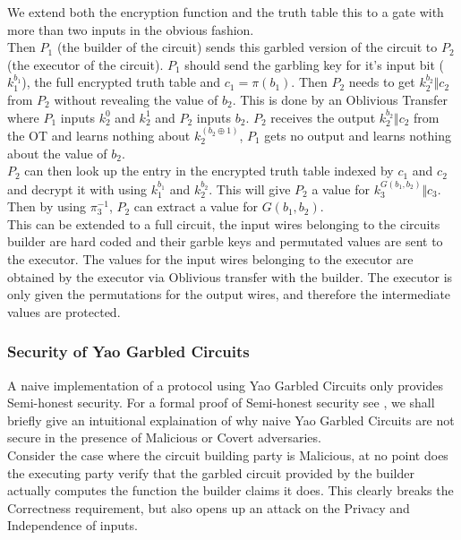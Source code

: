 \documentclass[a4paper,10pt]{article}
\begin{document}
				We extend both the encryption function and the truth table this to a gate with more than two inputs in the obvious fashion.\\

				Then $P_1$ (the builder of the circuit) sends this garbled version of the circuit to $P_2$ (the executor of the circuit). $P_1$ should send the garbling key for it's input bit ($k_1^{b_1}$), the full encrypted truth table and $c_1 = \pi(b_1)$. Then $P_2$ needs to get $k_2^{b_2} \Vert c_2$ from $P_2$ without revealing the value of $b_2$. This is done by an Oblivious Transfer where $P_1$ inputs $k_2^0$ and $k_2^1$ and $P_2$ inputs $b_2$. $P_2$ receives the output $k_2^{b_2} \Vert c_2$ from the OT and learns nothing about $k_2^{(b_2 \oplus 1)} $, $P_1$ gets no output and learns nothing about the value of $b_2$.\\

				$P_2$ can then look up the entry in the encrypted truth table indexed by $c_1$ and $c_2$ and decrypt it with using $k_1^{b_1}$ and  $k_2^{b_2}$. This will give $P_2$ a value for $k_3^{G(b_1, b_2)} \Vert c_3$. Then by using $\pi_3^{-1}$, $P_2$ can extract a value for $G(b_1, b_2)$.\\

				This can be extended to a full circuit, the input wires belonging to the circuits builder are hard coded and their garble keys and permutated values are sent to the executor. The values for the input wires belonging to the executor are obtained by the executor via Oblivious transfer with the builder. The executor is only given the permutations for the output wires, and therefore the intermediate values are protected.

			\subsubsection{Security of Yao Garbled Circuits}
				A naive implementation of a protocol using Yao Garbled Circuits only provides Semi-honest security. For a formal proof of Semi-honest security see \cite{ProofOfYaoSecurity}, we shall briefly give an intuitional explaination of why naive Yao Garbled Circuits are not secure in the presence of Malicious or Covert adversaries.\\
		
				Consider the case where the circuit building party is Malicious, at no point does the executing party verify that the garbled circuit provided by the builder actually computes the function the builder claims it does. This clearly breaks the Correctness requirement, but also opens up an attack on the Privacy and Independence of inputs.\\
\end{document}
